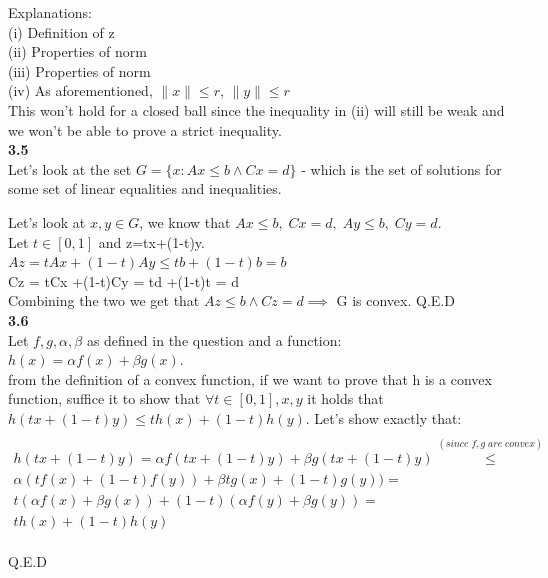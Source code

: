 \documentclass[fleqn]{article}
\begin{document}
Explanations:\\
(i)   Definition of z\\
(ii)  Properties of norm\\
(iii) Properties of norm\\
(iv)  As aforementioned, $\|x\| \leq r$, $\|y\| \leq r$\\

This won't hold for a closed ball since the inequality in (ii) will still be weak and we won't be able to prove a strict inequality. \\

\textbf{3.5} \\

Let's look at the set $G = \{ x : Ax \leq b \wedge Cx = d\}$ - which is the set of solutions for some set of linear equalities and inequalities.

Let's look at $x,y \in G$, we know that $Ax \leq b, \; Cx=d, \; Ay \leq b, \; Cy=d$.\\
Let $t\in [0,1]$ and z=tx+(1-t)y. \\
$Az = tAx+(1-t)Ay \leq tb+(1-t)b = b$ \\
Cz = tCx +(1-t)Cy = td +(1-t)t = d \\

Combining the two we get that $Az \leq b \wedge Cz=d \implies $ G is convex. Q.E.D \\

\textbf{3.6} \\
Let $f,g,\alpha,\beta$ as defined in the question and a function: $h(x)=\alpha f(x) + \beta g(x)$.\\

from the definition of a convex function, if we want to prove that h is a convex function, suffice it to show that $\forall t\in [0,1], x,y$ it holds that $h(tx+(1-t)y) \leq th(x)+(1-t)h(y)$. Let's show exactly that:\\

\begin{align*} \\
h(tx+(1-t)y) = \alpha f(tx+(1-t)y) +\beta g(tx+(1-t)y) \stackrel{(since \; f,g \; are \; convex)}{\leq} \\
\alpha (t f(x)+(1-t)f(y)) + \beta tg(x)+(1-t)g(y)) = \\
t(\alpha f(x) + \beta g(x)) + (1-t)(\alpha f(y) + \beta g(y)) =\\
th(x)+(1-t)h(y)
\end{align*} \\
Q.E.D\\
\end{document}

